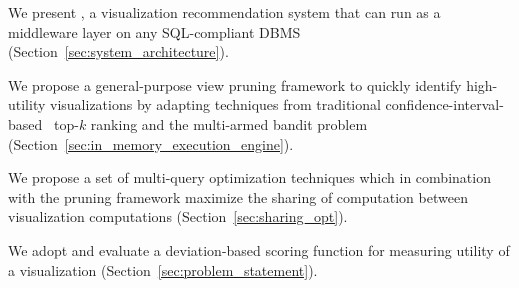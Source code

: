  
\begin{denselist}
  \item We present \SeeDB, a visualization recommendation system that can run
  as a middleware layer on any SQL-compliant DBMS (Section~\ref{sec:system_architecture}).
  \item We propose a general-purpose view pruning framework to quickly identify
  high-utility visualizations by adapting techniques from traditional 
  confidence-interval-based~\cite{hoeffding1963probability} top-$k$ ranking and the
   multi-armed bandit problem~\cite{bandits} (Section~\ref{sec:in_memory_execution_engine}).
  \item We propose a set of multi-query optimization techniques which in combination
  with the pruning framework maximize the sharing of computation between visualization
  computations (Section~\ref{sec:sharing_opt}).
  \item We adopt and evaluate a deviation-based scoring function for measuring utility
  of a visualization (Section~\ref{sec:problem_statement}).

\end{denselist}
